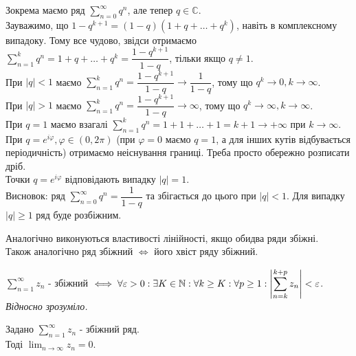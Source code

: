 \documentclass{math_library}
\begin{document}
\begin{example}
Зокрема маємо ряд $\displaystyle\sum_{n=0}^\infty q^n$, але тепер $q \in \mathbb{C}$.\\
Зауважимо, що $1-q^{k+1} = (1-q)(1+q+\dots+q^k)$, навіть в комплексному випадоку. Тому все чудово, звідси отримаємо\\
$\displaystyle\sum_{n=1}^k q^n = 1 + q + \dots + q^k = \dfrac{1-q^{k+1}}{1-q}$, тільки якщо $q \neq 1$.\\
При $|q| < 1$ маємо $\displaystyle\sum_{n=1}^k q^n = \dfrac{1-q^{k+1}}{1-q} \to \dfrac{1}{1-q}$, тому що $q^k \to 0, k \to \infty$.\\
При $|q| > 1$ маємо $\displaystyle\sum_{n=1}^k q^n = \dfrac{1-q^{k+1}}{1-q} \to \infty$, тому що $q^k \to \infty, k \to \infty$.\\
При $q = 1$ маємо взагалі $\displaystyle\sum_{n=1}^k q^n = 1 + 1 + \dots + 1 = k+1 \to +\infty$ при $k \to \infty$.\\
При $q = e^{i\varphi}, \varphi \in (0,2\pi)$ (при $\varphi = 0$ маємо $q=1$, а для інших кутів відбувається періодичність) отримаємо неіснування границі. Треба просто обережно розписати дріб.\\
Точки $q = e^{i\varphi}$ відповідають випадку $|q| = 1$.\\
Висновок: ряд $\displaystyle\sum_{n=0}^\infty q^n = \dfrac{1}{1-q}$ та збігається до цього при $|q| < 1$. Для випадку $|q| \geq 1$ ряд буде розбіжним.
\end{example}

\begin{remark}
Аналогічно виконуються властивості лінійності, якщо обидва ряди збіжні.\\
Також аналогічно ряд збіжний $\iff$ його хвіст ряду збіжний.
\end{remark}

\begin{theorem}
$\displaystyle\sum_{n=1}^\infty z_n$ - збіжний $\iff \forall \varepsilon > 0: \exists K \in \mathbb{N}: \forall k \geq K: \forall p \geq 1: \displaystyle\abs{\sum_{n=k}^{k+p} z_n} < \varepsilon$.\\
\textit{Відносно зрозуміло.}
\end{theorem}

\begin{corollary}
Задано $\displaystyle\sum_{n=1}^\infty z_n$ - збіжний ряд.\\
Тоді $\displaystyle\lim_{n \to \infty} z_n = 0$.
\end{corollary}
\end{document}

